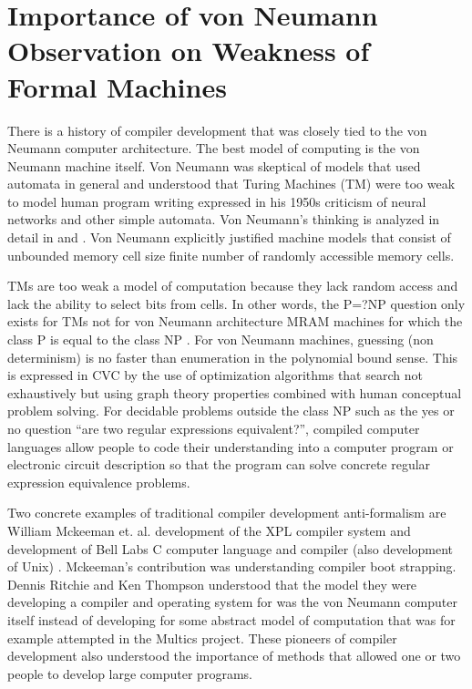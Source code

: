 \documentclass[preprint, authoryear]{sigplanconf}
\begin{document}
\section{Importance of von Neumann Observation on Weakness of Formal Machines}
\par
There is a history of compiler development that was closely tied
to the von Neumann computer architecture.  The best model
of computing is the von Neumann machine itself.
Von Neumann was skeptical of models that used
automata in general and understood that Turing Machines (TM) were too
weak to model human program writing expressed in his 1950s criticism
of neural networks and other simple automata.  Von Neumann's thinking is
analyzed in detail in \cite{Aspray1990} and \cite{Meyer2016}.
Von Neumann explicitly justified machine models that consist of unbounded
memory cell size finite number of randomly accessible memory cells.
\par
TMs are too weak a model of computation because they lack random access
and lack the ability to select bits from cells.
In other words, the P=?NP question only exists for TMs not for
von Neumann architecture MRAM machines for which the class P is equal
to the class NP \cite{Hartmanis1976} \cite{Meyer2016}.
For von Neumann machines, guessing (non determinism) is no faster
than enumeration in the polynomial bound sense.
This is expressed in CVC by the use of optimization
algorithms that search not exhaustively but using graph theory properties
combined with human conceptual problem solving.
For decidable problems outside the class NP such as the yes or
no question ``are two regular expressions equivalent?'',
compiled computer languages
allow people to code their understanding into a computer program or
electronic circuit description so that the program can solve
concrete regular expression equivalence problems.
\par
Two concrete examples of traditional compiler development
anti-formalism are William Mckeeman et. al. development of the
XPL compiler system \cite{Mckeeman1971} and development of Bell
Labs C computer language and compiler (also development of Unix)
\cite{Ritchie1993}.  Mckeeman's contribution was understanding
compiler boot strapping.
Dennis Ritchie and Ken Thompson understood that the model they
were developing a compiler and operating system for was the
von Neumann computer itself instead of developing for some abstract
model of computation that was for example attempted in the  
Multics project.  These pioneers of compiler development also
understood the importance of methods that allowed one or two people to
develop large computer programs.
\end{document}
